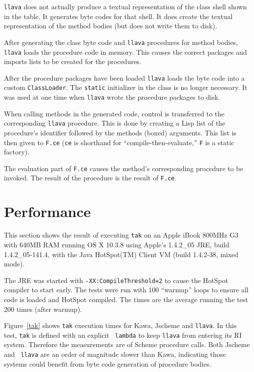 \documentclass[final]{ieee}
\begin{document}
{\tt llava} does not actually produce a textual representation of the
class shell shown in the table.  It generates byte codes for that
shell.  It does create the textual representation of the method bodies
(but does not write them to disk).

After generating the class byte code and {\tt llava} procedures for
method bodies, {\tt llava} loads the procedure code in memory.  This
causes the correct packages and imports lists to be created for the
procedures.

After the procedure packages have been loaded {\tt llava} loads the
byte code into a custom {\tt ClassLoader}.  The {\tt static}
initializer in the class is no longer necessary.  It was used at one
time when {\tt llava} wrote the procedure packages to disk.

When calling methods in the generated code, control is transferred to
the corresponding {\tt llava} procedure.  This is done by creating a
Lisp list of the procedure's identifier followed by the methods
(boxed) arguments.  This list is then given to {\tt F.ce} ({\tt ce} is
shorthand for ``compile-then-evaluate,'' {\tt F} is a static factory).

The evaluation part of {\tt F.ce} causes the method's corresponding
procedure to be invoked.  The result of the procedure is the result
of {\tt F.ce}.


\section{Performance}

This section shows the result of executing {\tt tak} \cite{gabriel} on
an Apple iBook 800MHz G3 with 640MB RAM running OS X 10.3.8 using
Apple's 1.4.2\_05 JRE, build 1.4.2\_05-141.4, with the Java HotSpot(TM)
Client VM (build 1.4.2-38, mixed mode).


The JRE was started with {\tt -XX:CompileThreshold=2} to cause the
HotSpot compiler to start early.  The tests were run with 100
``warmup'' loops to ensure all code is loaded and HotSpot compiled.
The times are the average running the test 200 times (after warmup).

Figure~\ref{tak} shows {\tt tak} execution times for Kawa, Jscheme and
{\tt llava}.  In this test, {\tt tak} is defined with an explicit {\tt
lambda} to keep {\tt llava} from entering its RI system.  Therefore
the measurements are of Scheme procedure calls.  Both Jscheme and {\tt
llava} are an order of magnitude slower than Kawa, indicating those
systems could benefit from byte code generation of procedure bodies.
\end{document}
